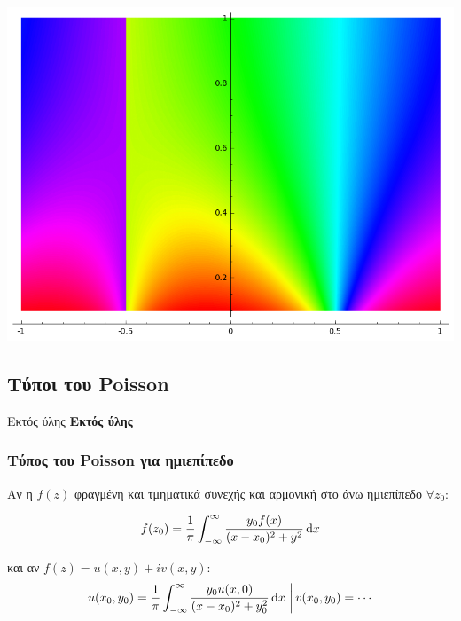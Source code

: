\documentclass[12pt,a4paper,notitlepage,fleqn]{article}
\begin{document}
    \begin{center}
    \includegraphics[width=0.8\linewidth]{graphics/sage1}
    \end{center}
    
    \subsection{Τύποι του Poisson}
    \begin{attnbox}{Εκτός ύλης}
    	\textbf{\large Εκτός ύλης}
    \end{attnbox}
    
    \subsubsection{Τύπος του Poisson για ημιεπίπεδο}
    
    Αν η \( f(z) \) φραγμένη και τμηματικά συνεχής και αρμονική στο άνω ημιεπίπεδο
    \( \forall z_0 \):
    
    \[
    f(z_0) = \frac{1}{\pi} \int_{-\infty}^{\infty}
    \frac{y_0f(x)}{(x-x_0)^2+y^2} \mathop{}\!\mathrm{d} x
    \]
    
    και αν \( f(z) = u(x,y) + iv(x,y) \):
    \[
    \left.
    u(x_0,y_0) = \frac{1}{\pi} \int_{-\infty}^{\infty}
    \frac{y_0u(x,0)}{(x-x_0)^2 + y_0^2}\mathop{}\!\mathrm{d} x 
    \ \right|
    v(x_0,y_0) = \cdots
    \]
    
    
\end{document}
